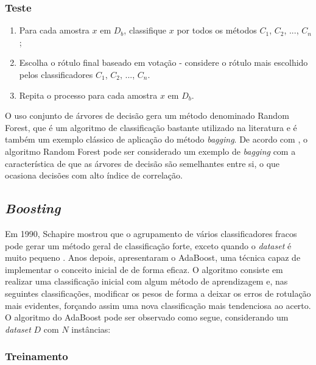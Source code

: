 \subsubsection*{Teste}

\begin{enumerate}
    \item Para cada amostra \textbf{$x$} em \textbf{$D_b$}, classifique \textbf{$x$} por todos os métodos \textbf{$C_1$}, \textbf{$C_2$}, ..., \textbf{$C_n$};
    \item Escolha o rótulo final baseado em votação - considere o rótulo mais escolhido pelos classificadores \textbf{$C_1$}, \textbf{$C_2$}, ..., \textbf{$C_n$}.
    \item Repita o processo para cada amostra \textbf{$x$} em \textbf{$D_b$}.
\end{enumerate}

O uso conjunto de árvores de decisão gera um método denominado Random Forest, que é um algoritmo de classificação bastante utilizado na literatura e é também um exemplo clássico de aplicação do método \textit{bagging}. De acordo com , o algoritmo Random Forest pode ser considerado um exemplo de \textit{bagging} com a característica de que as árvores de decisão são semelhantes entre si, o que ocasiona decisões com alto índice de correlação.



\subsection{\textit{Boosting}}

Em 1990, Schapire mostrou que o agrupamento de vários classificadores fracos pode gerar um método geral de classificação forte, exceto quando o \textit{dataset} é muito pequeno  \cite{schapire1990strength}. Anos depois,  apresentaram o AdaBoost, uma técnica capaz de implementar o conceito inicial de  de forma eficaz. O algoritmo consiste em realizar uma classificação inicial com algum método de aprendizagem e, nas seguintes classificações, modificar os pesos de forma a deixar os erros de rotulação mais evidentes, forçando assim uma nova classificação mais tendenciosa ao acerto. O algoritmo do AdaBoost pode ser observado como segue, considerando um \textit{dataset} \textbf{$D$} com \textbf{$N$} instâncias:

\subsubsection*{Treinamento}

